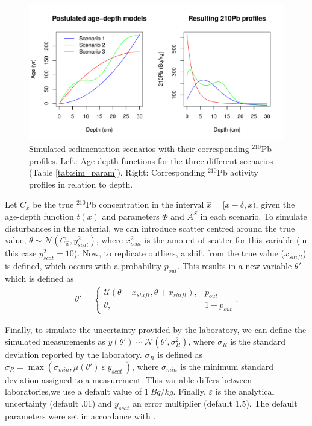 \documentclass [10pt] {article}
\begin{document}
\begin{figure}[!h]
 \centering
  \includegraphics[width=.95\linewidth]{chronology.pdf}
	\caption{Simulated sedimentation scenarios with their corresponding $^{210}$Pb profiles. Left: Age-depth functions for the three different scenarios (Table \ref{tab:sim_param}). Right: Corresponding $^{210}$Pb activity profiles in relation to depth.}
  \label{fig:true_210}
\end{figure}


	Let $C_{\hat{x}}$ be the true $^{210}$Pb concentration in the interval $\hat{x}=[ x-\delta, x)$, given the age-depth function $t(x)$ and parameters $\Phi$ and $A^S$ in each scenario. 
To simulate disturbances in the material, we can introduce scatter centred around the true value, $\theta \sim \mathcal{N}\left(C_{\hat{x}},y^2_{scat}\right)$, where $x^2_{scat}$ is the amount of scatter for this variable (in this case $y^2_{scat}=10$). 
Now, to replicate outliers, a shift from the true value ($x_{shift}$) is defined, which occurs with a probability $p_{out}$. This results in a new variable $\theta'$ which is defined as
\begin{align}
	\theta' = \begin{cases}
			\mathcal{U}(\theta - x_{shift},\theta + x_{shift}), &  p_{out} \\
			\theta, & 1-p_{out}
		\end{cases}.
\end{align}

	Finally, to simulate the uncertainty provided by the laboratory, we can define the simulated measurements as  $y(\theta')\sim\mathcal{N}\left(\theta',\sigma_R^2\right)$, where $\sigma_R$ is the standard deviation reported by the laboratory. 
$\sigma_R$ is defined as $\sigma_R= \max \left(\sigma_{min}, \mu(\theta')~\varepsilon~y_{scat}~\right)$, where $\sigma_{min}$ is the minimum standard deviation assigned to a measurement. This variable differs between laboratories,we use a default value of $1~ Bq/kg$. 
Finally, $\varepsilon$ is the analytical uncertainty (default .01) and $y_{scat}$ an error multiplier (default 1.5).
The default parameters were set in accordance with \citet{Blaauw2018}.
\end{document}
